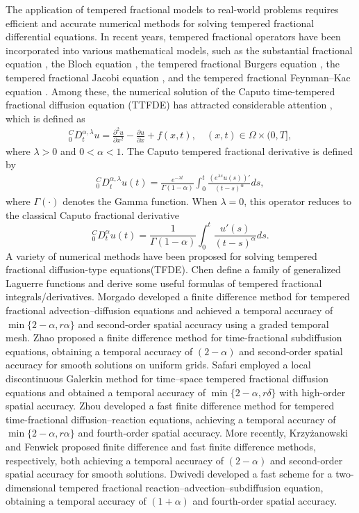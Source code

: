 \documentclass[10pt, reqno]{amsart}
\theoremstyle{remark}
\theoremstyle{definition}
\numberwithin{table}{section}
\begin{document}
The application of tempered fractional models to real-world problems requires efficient and accurate numerical methods for solving tempered fractional differential equations. In recent years, tempered fractional operators have been incorporated into various mathematical models, such as the substantial fractional equation \cite{huang2018}, the Bloch equation \cite{feng2022}, the tempered fractional Burgers equation \cite{dwivedi2025, wang2022}, the tempered fractional Jacobi equation \cite{zhao2023}, and the tempered fractional Feynman–Kac equation \cite{zhao2024}. Among these, the numerical solution of the Caputo time-tempered fractional diffusion equation (TTFDE) has attracted considerable attention \cite{dwivedi2024, fenwick2024, krzyzanowski2024, morgado2019, safari2022, zhao2020, zhou2024}, which is defined as
\begin{align}
{ }_0^C D_t^{\alpha, \lambda} u = \frac{\partial^2 u}{\partial x^2} - \frac{\partial u}{\partial x} + f(x,t), \quad (x,t) \in \Omega \times (0,T], \label{no1}
\end{align}
where $\lambda > 0$ and $0 < \alpha < 1$. The Caputo tempered fractional derivative is defined by
\begin{align}
{ }_0^C D_t^{\alpha, \lambda} u(t) = \frac{e^{-\lambda t}}{\Gamma(1-\alpha)} \int_0^t \frac{(e^{\lambda s} u(s))'}{(t-s)^\alpha} ds, \label{tempered}
\end{align}
where $\Gamma(\cdot)$ denotes the Gamma function. When $\lambda = 0$, this operator reduces to the classical Caputo fractional derivative
$$
{ }_0^C D_t^\alpha u(t)=\frac{1}{\Gamma(1-\alpha)} \int_0^t \frac{u'(s)}{(t-s)^{\alpha}}  d s. 
$$
A variety of numerical methods have been proposed for solving tempered fractional diffusion-type equations(TFDE). Chen \cite{chen2018} define a family of generalized Laguerre functions and derive some useful formulas of tempered fractional integrals/derivatives. Morgado \cite{morgado2019} developed a finite difference method for tempered fractional advection–diffusion equations and achieved a temporal accuracy of $\min\{2-\alpha, r\alpha\}$ and second-order spatial accuracy using a graded temporal mesh. Zhao \cite{zhao2020} proposed a finite difference method for time-fractional subdiffusion equations, obtaining a temporal accuracy of $(2-\alpha)$ and second-order spatial accuracy for smooth solutions on uniform grids. Safari \cite{safari2022} employed a local discontinuous Galerkin method for time–space tempered fractional diffusion equations and obtained a temporal accuracy of $\min\{2-\alpha, r\delta\}$ with high-order spatial accuracy. Zhou \cite{zhou2024} developed a fast finite difference method for tempered time-fractional diffusion–reaction equations, achieving a temporal accuracy of $\min\{2-\alpha, r\alpha\}$ and fourth-order spatial accuracy. More recently, Krzyżanowski \cite{krzyzanowski2024} and Fenwick \cite{fenwick2024} proposed finite difference and fast finite difference methods, respectively, both achieving a temporal accuracy of $(2-\alpha)$ and second-order spatial accuracy for smooth solutions. Dwivedi \cite{dwivedi2024} developed a fast scheme for a two-dimensional tempered fractional reaction–advection–subdiffusion equation, obtaining a temporal accuracy of $(1+\alpha)$ and fourth-order spatial accuracy. 
\end{document}
